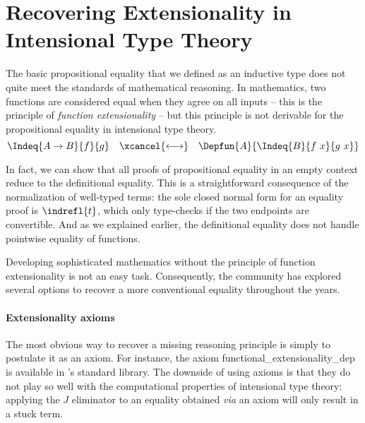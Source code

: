 \section{Recovering Extensionality in Intensional Type Theory}

The basic propositional equality that we defined as an inductive type does 
not quite meet the standards of mathematical reasoning.
% 
In mathematics, two functions are considered equal when they agree on all 
inputs -- this is the principle of \emph{function extensionality} --
% 
% 
but this principle is not derivable for the propositional equality in 
intensional type theory.
\[
  \Indeq{A \to B}{f}{g} \quad \xcancel{\longleftrightarrow} \quad \Depfun{A}{\Indeq{B}{f\ x}{g\ x}}
\]

In fact, we can show that all proofs of propositional equality in an empty 
context reduce to the definitional equality.
% 
This is a straightforward consequence of the normalization of well-typed terms:
the sole closed normal form for an equality proof is \( \indrefl{t} \), which
only type-checks if the two endpoints are convertible.
% 
And as we explained earlier, the definitional equality does not handle pointwise
equality of functions.


Developing sophisticated mathematics without the principle of 
function extensionality is not an easy task.
Consequently, the community has explored several options to recover a more 
conventional equality throughout the years.

\paragraph*{Extensionality axioms}
% 
The most obvious way to recover a missing reasoning principle is simply to
postulate it as an axiom. 
% 
% 
For instance, the axiom \textsf{functional\_extensionality\_dep} is available 
in \Coq's standard library.
% 
The downside of using axioms is that they do not play so well with the 
computational properties of intensional type theory:
% 
% 
applying the \( J \) eliminator to an equality obtained \textit{via} an axiom
will only result in a stuck term.

